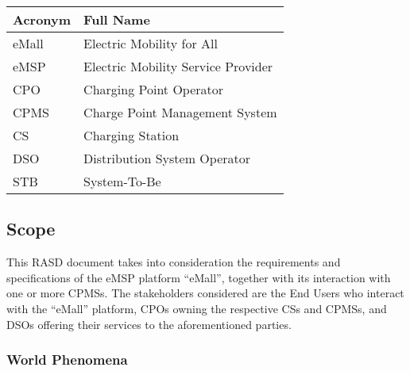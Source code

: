 \documentclass[11pt]{article}
\begin{document}
\begin{table}[H]
    \centering
    \setlength{\tabcolsep}{18pt}
    \renewcommand{\arraystretch}{1.2}
    \begin{tabularx}{\textwidth}{|>{\centering\hsize=0.3\hsize}X|>{\hsize=1.7\hsize}X|}
        \hline
        \textbf{Acronym} & \textbf{Full Name} \\
        \hline
        eMall & Electric Mobility for All \\
        \hline
        eMSP & Electric Mobility Service Provider \\
        \hline
        CPO & Charging Point Operator \\
        \hline
        CPMS & Charge Point Management System \\
        \hline
        CS & Charging Station \\
        \hline
        DSO & Distribution System Operator \\
        \hline
        STB & System-To-Be \\
        \hline
    \end{tabularx}
    \label{tab:acronyms}
\end{table}

\subsection{Scope}

This RASD document takes into consideration the requirements and specifications of the eMSP platform “eMall”, together with its interaction with one or more CPMSs. The stakeholders considered are the End Users who interact with the “eMall” platform, CPOs owning the respective CSs and CPMSs, and DSOs offering their services to the aforementioned parties.

\subsubsection{World Phenomena}
\end{document}
